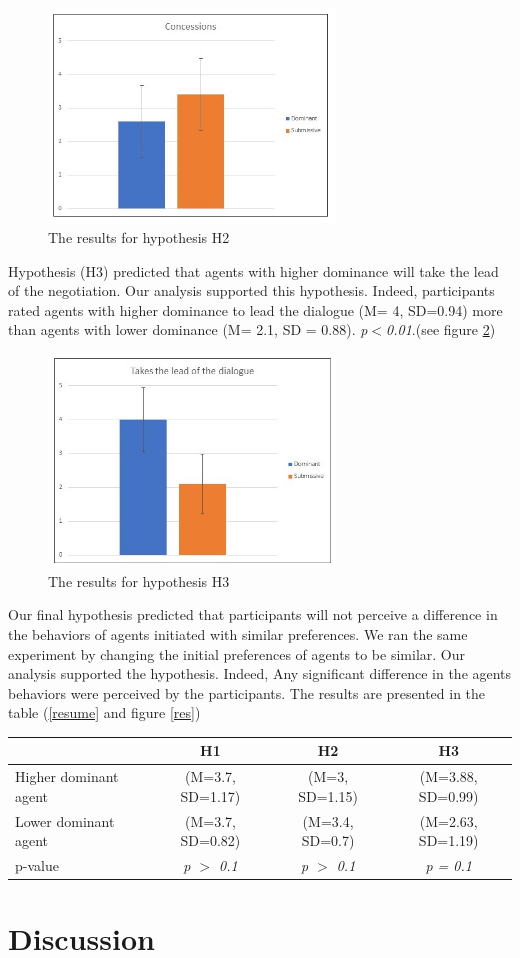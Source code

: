 \documentclass{llncs}
\begin{document}
		\begin{figure}[h]
			\centering
			\caption{\label{concession} The results for hypothesis H2}
			\includegraphics[width=3in]{plots/conced}
		\end{figure}
	
	\par Hypothesis (H3) predicted that agents with higher dominance will take the lead of the negotiation. Our analysis supported this hypothesis. Indeed, participants rated agents with higher dominance to lead the dialogue (M= 4, SD=0.94) more than agents with lower dominance (M= 2.1, SD = 0.88). \emph{p$<$0.01}.(see figure  \ref{lead})
			\begin{figure}[h]
				\centering
				\caption{\label{lead} The results for hypothesis H3}
				\includegraphics[width=3in]{plots/lead}
			\end{figure}
	\par Our final hypothesis predicted that participants will not perceive a difference in the behaviors of agents initiated with similar preferences. We ran the same experiment by changing the initial preferences of agents to be similar.  Our analysis supported the hypothesis. Indeed, Any significant difference in the agents behaviors were perceived by the participants. The results are presented in the table (\ref{resume} and figure \ref{res})

\begin{tabular}{|l|c|c|c|}
	\hline
	   & H1 & H2 & H3 \\
	\hline
	Higher dominant agent & (M=3.7, SD=1.17) & (M=3, SD=1.15) &(M=3.88, SD=0.99) \\
	\hline
	Lower dominant agent & (M=3.7, SD=0.82) & (M=3.4, SD=0.7) & (M=2.63, SD=1.19)\\
	\hline
	p-value &  \emph{p $>$ 0.1}  & \emph{p $>$ 0.1}  & \emph{p = 0.1} \\
	\hline
\end{tabular}
	
			
 \section{Discussion}
\vskip 4pt


\end{document}
